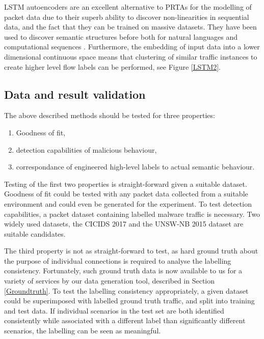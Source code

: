 \documentclass[a4paper,12pt,twoside]{report}
\begin{document}
LSTM autoencoders are an excellent alternative to PRTAs for the modelling of packet data due to their superb ability to discover non-linearities in sequential data, and the fact that they can be trained on massive datasets. They have been used to discover semantic structures before both for natural languages \cite{yang2017improved, silberer2014learning} and computational sequences \cite{yousefi2017autoencoder}.
 Furthermore, the embedding of input data into a lower dimensional continuous space means that clustering of similar traffic instances to create higher level flow labels can be performed, see Figure \ref{LSTM2}.

\subsection{Data and result validation}\label{Resultsval}

The above described methods should be tested for three properties:

\begin{enumerate}
\item Goodness of fit,
\item detection capabilities of malicious behaviour,
\item correspondance of engineered high-level labels to actual semantic behaviour.
\end{enumerate}

Testing of the first two properties is straight-forward given a suitable dataset. Goodness of fit could be tested with any packet data collected from a suitable environment and could even be generated for the experiment. To test detection capabilities, a packet dataset containing labelled malware traffic  is necessary. Two widely used datasets, the CICIDS 2017 and the UNSW-NB 2015 dataset are suitable candidates.

The third property is not as straight-forward to test, as hard ground truth about the purpose of individual connections is required to analyse the labelling consistency. Fortunately, such ground truth data is now available to us for a variety of services by our data generation tool, described in Section \ref{Groundtruth}. To test the labelling consistency appropriately, a given dataset could be superimposed with labelled ground truth traffic, and split into training and test data. If individual scenarios in the test set are both identified consistently  while associated with a different label than significantly different scenarios, the labelling can be seen as meaningful.  
\end{document}

